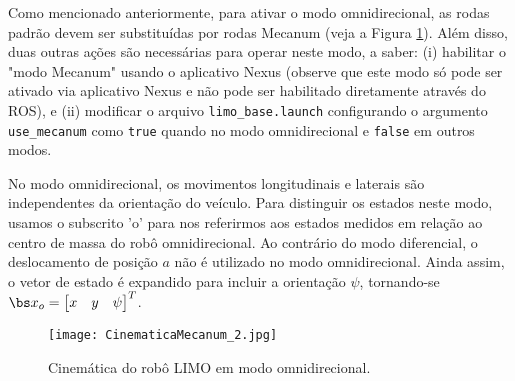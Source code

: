     Como mencionado anteriormente, para ativar o modo omnidirecional, as rodas padrão devem ser substituídas por rodas Mecanum (veja a Figura \ref{fig:MecanumKin}). Além disso, duas outras ações são necessárias para operar neste modo, a saber: (i) habilitar o "modo Mecanum" usando o aplicativo Nexus (observe que este modo só pode ser ativado via aplicativo Nexus e não pode ser habilitado diretamente através do ROS), e (ii) modificar o arquivo \texttt{limo\_base.launch} configurando o argumento \texttt{use\_mecanum} como \texttt{true} quando no modo omnidirecional e \texttt{false} em outros modos.
    
    No modo omnidirecional, os movimentos longitudinais e laterais são independentes da orientação do veículo. Para distinguir os estados neste modo, usamos o subscrito 'o' para nos referirmos aos estados medidos em relação ao centro de massa do robô omnidirecional. Ao contrário do modo diferencial, o deslocamento de posição $a$ não é utilizado no modo omnidirecional. Ainda assim, o vetor de estado é expandido para incluir a orientação $\psi$, tornando-se $\bs x_o = \begin{bmatrix} x & y & \psi \end{bmatrix}^T$.
    
    \begin{figure}[htb]
        \centering
        \caption{Cinemática do robô LIMO em modo omnidirecional.}
        \texttt{[image: CinematicaMecanum\_2.jpg]}
        
        \label{fig:MecanumKin}
    \end{figure}
    
